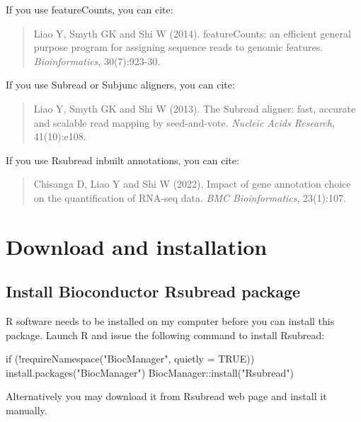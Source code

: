 \documentclass[12pt]{report}
\newcommand{\Subread}{\textsf{Subread}}
\newcommand{\Subjunc}{\textsf{Subjunc}}
\newcommand{\Rsubread}{\textsf{Rsubread}}
\newcommand{\featureCounts}{\textsf{featureCounts}}
\newcommand{\R}{\textsf{R}}
\begin{document}
If you use \featureCounts, you can cite:

\begin{quote}
Liao Y, Smyth GK and Shi W (2014). 
featureCounts: an efficient general purpose program for assigning sequence reads to genomic features. 
\emph{Bioinformatics}, 30(7):923-30.
\\
{}
\end{quote}

If you use {\Subread} or {\Subjunc} aligners, you can cite:

\begin{quote}
Liao Y, Smyth GK and Shi W (2013). 
The Subread aligner: fast, accurate and scalable read mapping by seed-and-vote. 
\emph{Nucleic Acids Research}, 41(10):e108.
\\
{ }
\end{quote}

If you use {\Rsubread} inbuilt annotations, you can cite:

\begin{quote}
Chisanga D, Liao Y and Shi W (2022). 
Impact of gene annotation choice on the quantification of RNA‑seq data.
\emph{BMC Bioinformatics}, 23(1):107.
\\
{ }
\end{quote}



\newpage

\section{Download and installation}

\subsection{Install Bioconductor {\Rsubread} package}

{\R} software needs to be installed on my computer before you can install this package.
Launch {\R} and issue the following command to install {\Rsubread}:

\begin{Rcode}
if (!requireNamespace("BiocManager", quietly = TRUE))
    install.packages("BiocManager")
BiocManager::install("Rsubread")
\end{Rcode}

Alternatively you may download it from {\Rsubread} web page {} and install it manually.
\end{document}
